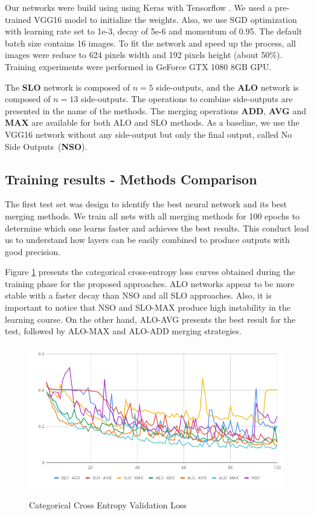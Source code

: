 Our networks were build using using Keras \cite{chollet2015keras} with Tensorflow \cite{tensorflow2015-whitepaper}. We used a pre-trained VGG16 model to initialize the weights. Also, we use SGD optimization with learning rate set to 1e-3, decay of 5e-6 and momentum of 0.95. The default batch size contains 16 images. To fit the network and speed up the process, all images were reduce to 624 pixels width and 192 pixels height (about 50\%). Training experiments were performed in GeForce GTX 1080 8GB GPU.

The \textbf{SLO} network is composed of $n=5$ side-outputs, and the \textbf{ALO} network is composed of $n=13$ side-outputs. 
The operations to combine side-outputs are presented in the name of the methods. The merging operations \textbf{ADD}, \textbf{AVG} and \textbf{MAX} are available for both ALO and SLO methods.
As a baseline, we use the VGG16 network without any side-output but only the final output, called No Side Outputs~(\textbf{NSO}).

\subsection{Training results - Methods Comparison}

The first test set was design to identify the best neural network and its best merging methods. We train all nets with all merging methods for 100 epochs to determine which one learns faster and achieves the best results. This conduct lead us to understand how layers can be easily combined to produce outputs with good precision.

Figure \ref{fig:validation_loss} presents the categorical cross-entropy loss curves obtained during the training phase for the proposed approaches. ALO networks appear to be more stable with a faster decay than NSO and all SLO approaches. Also, it is important to notice that NSO and SLO-MAX produce high instability in the learning course. On the other hand, ALO-AVG presents the best result for the test, followed by ALO-MAX and ALO-ADD merging strategies.

\begin{figure}
  \caption{Categorical Cross Entropy Validation Loss  }
  \centering
    \includegraphics[width=1.\columnwidth]{figures/falreis/validation_loss.png}
  \label{fig:validation_loss}
\end{figure}

